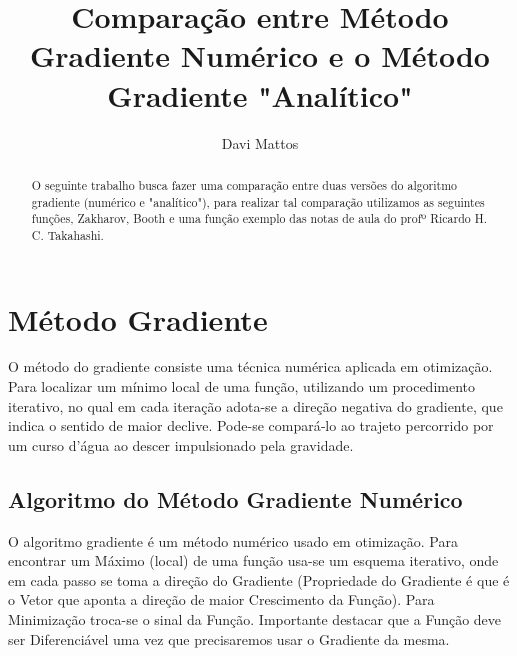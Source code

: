\documentclass[runningheads]{llncs}
\begin{document}
%
\title{Comparação entre Método Gradiente Numérico e o Método Gradiente "Analítico"}
%
%
\author{Davi Mattos}
%
%
%
\maketitle              %
%
\begin{abstract}
O seguinte trabalho busca fazer uma comparação entre duas versões do algoritmo gradiente (numérico e "analítico"), para realizar tal comparação utilizamos as seguintes funções, Zakharov, Booth e uma função exemplo das notas de aula do profº Ricardo H. C. Takahashi. 

\end{abstract}
%
%
%
\section{Método Gradiente}

O método do gradiente consiste uma técnica numérica aplicada em otimização. Para localizar um mínimo local de uma função, utilizando um procedimento iterativo, no qual em cada iteração adota-se a direção negativa do gradiente, que indica o sentido de maior declive. Pode-se compará‑lo ao trajeto percorrido por um curso d’água ao descer impulsionado pela gravidade.

\subsection{Algoritmo do Método Gradiente Numérico}
O algoritmo gradiente é um método numérico usado em otimização. Para encontrar um Máximo (local) de uma função usa-se um esquema iterativo, onde em cada passo se toma a direção do Gradiente (Propriedade do Gradiente é que é o Vetor que aponta a direção de maior Crescimento da Função). Para Minimização troca-se o sinal da Função. Importante destacar que a Função deve ser Diferenciável uma vez que precisaremos usar o Gradiente da mesma.
\end{document}
